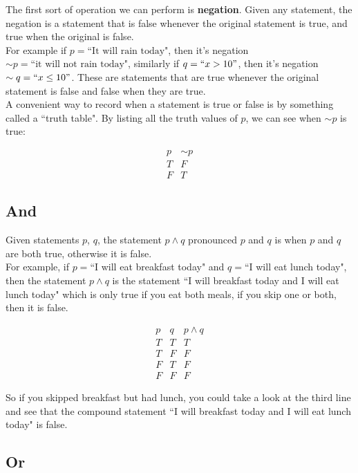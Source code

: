 The first sort of operation we can perform is  \textbf{negation}.  Given any statement, the negation is a statement that is false whenever the original statement is true, and true when the original is false.\\

For example if $p=\text{``It will rain today"}$,  then it's negation $\sim p=\text{``it will not rain today"}$, similarly if $q=``x>10"$, then it's negation $\sim q =``x\leq 10"$.  These are statements that are true whenever the original statement is false and false when they are true.\\

A convenient way to record when a statement is true or false is by something called a ``truth table".  By listing all the truth values of $p$, we can see when $\sim p$ is true:

$$\begin{array}{c|c}
p&\sim p\\
\hline
T & F\\
F&T
\end{array}$$


\subsection{And}

Given statements $p$, $q$, the statement $p\wedge q$ pronounced $p$ and $q$ is when $p$ and $q$ are both true, otherwise it is false.\\

For example, if $p=$``I will eat breakfast today" and $q=$``I will eat lunch today", then the statement $p\wedge q$ is the statement ``I will breakfast today and I will eat lunch today" which is only true if you eat both meals, if you skip one or both, then it is false.

$$\begin{array}{c|c|c}
p&q&p\wedge q\\
\hline
T & T&T\\
T&F&F\\
F&T&F\\
F&F&F
\end{array}$$

So if you skipped breakfast but had lunch, you could take a look at the third line and see that the compound statement ``I will breakfast today and I will eat lunch today" is false.



\subsection{Or}

